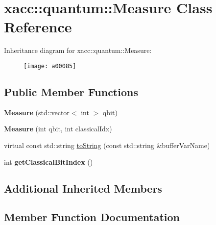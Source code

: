 \hypertarget{a00085}{}\section{xacc\+:\+:quantum\+:\+:Measure Class Reference}
\label{a00085}
Inheritance diagram for xacc\+:\+:quantum\+:\+:Measure\+:\begin{figure}[H]
\begin{center}
\leavevmode
\texttt{[image: a00085]}
\end{center}
\end{figure}
\subsection*{Public Member Functions}
\begin{DoxyCompactItemize}
\item 
{\bfseries Measure} (std\+::vector$<$ int $>$ qbit)\hypertarget{a00085_afe330a0eea029d842ff9c88a817dcc7d}{}\label{a00085_afe330a0eea029d842ff9c88a817dcc7d}

\item 
{\bfseries Measure} (int qbit, int classical\+Idx)\hypertarget{a00085_a9b8d9edca8ad2c3fb132780200f17335}{}\label{a00085_a9b8d9edca8ad2c3fb132780200f17335}

\item 
virtual const std\+::string \hyperlink{a00085_a1c51a5d68294dcb2ba1a9fbea63a730f}{to\+String} (const std\+::string \&buffer\+Var\+Name)
\item 
int {\bfseries get\+Classical\+Bit\+Index} ()\hypertarget{a00085_a0cb3c94731544042807236ade36fddd0}{}\label{a00085_a0cb3c94731544042807236ade36fddd0}

\end{DoxyCompactItemize}
\subsection*{Additional Inherited Members}


\subsection{Member Function Documentation}
